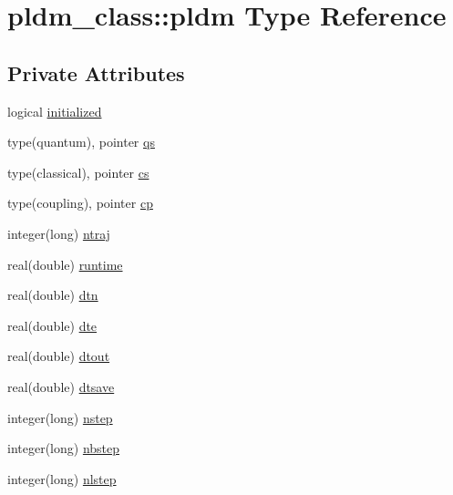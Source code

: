 \hypertarget{structpldm__class_1_1pldm}{\section{pldm\-\_\-class\-:\-:pldm Type Reference}
\label{structpldm__class_1_1pldm}
}
\subsection*{Private Attributes}
\begin{DoxyCompactItemize}
\item 
logical \hyperlink{structpldm__class_1_1pldm_a1f68ee324c28b824df1acf99db3d7a6f}{initialized}
\item 
type(quantum), pointer \hyperlink{structpldm__class_1_1pldm_a928fc31d7c422b903cf8be2c66ecc8ab}{qs}
\item 
type(classical), pointer \hyperlink{structpldm__class_1_1pldm_a2366c673bb4049d423c1605f801c49ab}{cs}
\item 
type(coupling), pointer \hyperlink{structpldm__class_1_1pldm_a029ca44825538a8806a9383f1b04914e}{cp}
\item 
integer(long) \hyperlink{structpldm__class_1_1pldm_aab5aaef447d621035a2492d5c64aa965}{ntraj}
\item 
real(double) \hyperlink{structpldm__class_1_1pldm_a6792078530b667f6e179e339ad3f705b}{runtime}
\item 
real(double) \hyperlink{structpldm__class_1_1pldm_a03a577c0a1845e2f6b01ab5aacb9bd0f}{dtn}
\item 
real(double) \hyperlink{structpldm__class_1_1pldm_a59460330dd0feba03a287ac14711d9a8}{dte}
\item 
real(double) \hyperlink{structpldm__class_1_1pldm_a0eb418c77739ccce504fb1b253fb81ba}{dtout}
\item 
real(double) \hyperlink{structpldm__class_1_1pldm_a94c39a7e7249bd187ee05bf43e4f6949}{dtsave}
\item 
integer(long) \hyperlink{structpldm__class_1_1pldm_a4cf2258a15663bb09c8deaacc46f8feb}{nstep}
\item 
integer(long) \hyperlink{structpldm__class_1_1pldm_a7559842c3c853eff4da5c5c59b5ca456}{nbstep}
\item 
integer(long) \hyperlink{structpldm__class_1_1pldm_a0c305b91e7503b54c413d3e84e83814f}{nlstep}
\end{DoxyCompactItemize}


